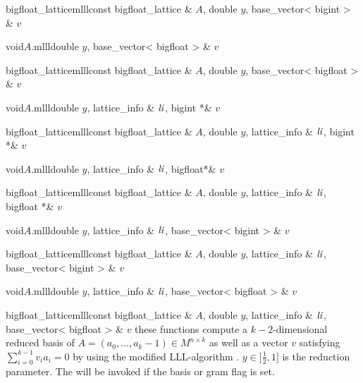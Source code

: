 \begin{fcode}{bigfloat_lattice}{mlll}{const bigfloat_lattice & $A$, double $y$,
    base_vector< bigint > & $v$}%
\end{fcode}

\begin{fcode}{void}{$A$.mlll}{double $y$, base_vector< bigfloat > & $v$}
\end{fcode}

\begin{fcode}{bigfloat_lattice}{mlll}{const bigfloat_lattice & $A$, double $y$,
    base_vector< bigfloat > & $v$}%
\end{fcode}

\begin{fcode}{void}{$A$.mlll}{double $y$, lattice_info & $\mathit{li}$, bigint *& $v$}
\end{fcode}

\begin{fcode}{bigfloat_lattice}{mlll}{const bigfloat_lattice & $A$, double $y$,
    lattice_info & $\mathit{li}$, bigint *& $v$}%
\end{fcode}

\begin{fcode}{void}{$A$.mlll}{double $y$, lattice_info & $\mathit{li}$, bigfloat*& $v$}
\end{fcode}

\begin{fcode}{bigfloat_lattice}{mlll}{const bigfloat_lattice & $A$, double $y$,
    lattice_info & $\mathit{li}$, bigfloat *& $v$}%
\end{fcode}

\begin{fcode}{void}{$A$.mlll}{double $y$, lattice_info & $\mathit{li}$, base_vector< bigint > & $v$}
\end{fcode}

\begin{fcode}{bigfloat_lattice}{mlll}{const bigfloat_lattice & $A$, double $y$,
    lattice_info & $\mathit{li}$, base_vector< bigint > & $v$}%
\end{fcode}

\begin{fcode}{void}{$A$.mlll}{double $y$, lattice_info & $\mathit{li}$, base_vector< bigfloat > & $v$}
\end{fcode}

\begin{fcode}{bigfloat_lattice}{mlll}{const bigfloat_lattice & $A$, double $y$,
    lattice_info & $\mathit{li}$, base_vector< bigfloat > & $v$}%
  these functions compute a $k-2$-dimensional reduced basis of $A = (a_0, \dots, a_k-1) \in M^{n
    \times k}$ as well as a vector $v$ satisfying $\sum_{i=0}^{k-1} v_i a_i = 0$ by using the
  modified LLL-algorithm \cite{Pohst/Zassenhaus:1989}.  $y \in ]\frac{1}{2},1]$ is the reduction
  parameter.  The \LEH will be invoked if the basis or gram flag is set.
\end{fcode}


